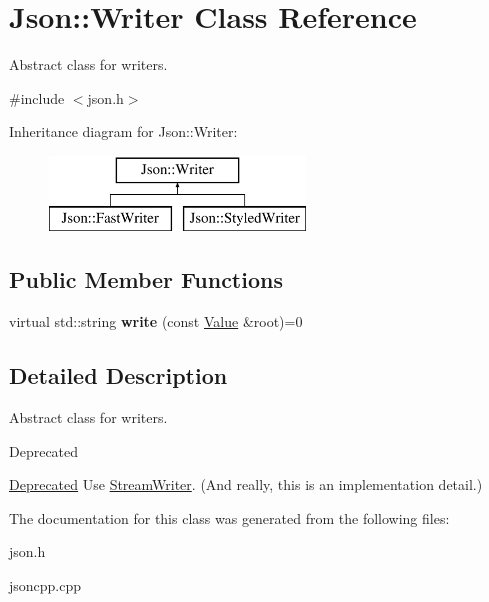 \hypertarget{class_json_1_1_writer}{\section{Json\-:\-:Writer Class Reference}
\label{class_json_1_1_writer}
}


Abstract class for writers.  




{\ttfamily \#include $<$json.\-h$>$}

Inheritance diagram for Json\-:\-:Writer\-:\begin{figure}[H]
\begin{center}
\leavevmode
\includegraphics[height=2.000000cm]{class_json_1_1_writer}
\end{center}
\end{figure}
\subsection*{Public Member Functions}
\begin{DoxyCompactItemize}
\item 
\hypertarget{class_json_1_1_writer_a7b2273a4ffd6f32b369ac8a53b7b5a0d}{virtual std\-::string {\bfseries write} (const \hyperlink{class_json_1_1_value}{Value} \&root)=0}\label{class_json_1_1_writer_a7b2273a4ffd6f32b369ac8a53b7b5a0d}

\end{DoxyCompactItemize}


\subsection{Detailed Description}
Abstract class for writers. 

\begin{DoxyRefDesc}{Deprecated}
\item[\hyperlink{deprecated__deprecated000007}{Deprecated}]Use \hyperlink{class_json_1_1_stream_writer}{Stream\-Writer}. (And really, this is an implementation detail.) \end{DoxyRefDesc}


The documentation for this class was generated from the following files\-:\begin{DoxyCompactItemize}
\item 
json.\-h\item 
jsoncpp.\-cpp\end{DoxyCompactItemize}
